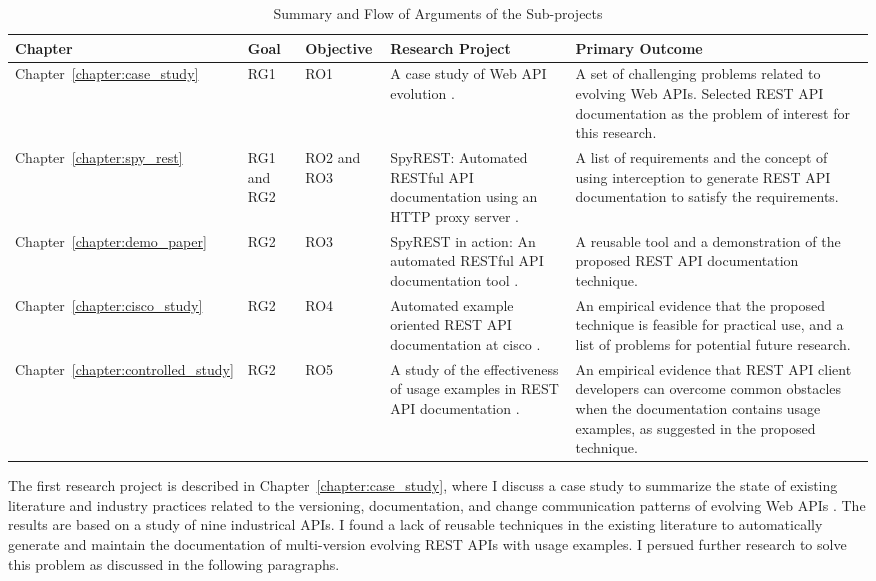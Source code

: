 \begin{table}
  \caption{Summary and Flow of Arguments of the Sub-projects}
  \begin{tabular}{|p{1.5cm}|p{1.5cm}|p{1.5cm}|p{4.5cm}|p{6cm}|}
  \hline
  Chapter & Goal & Objective & Research Project & Primary Outcome \\
  \hline
  Chapter~\ref{chapter:case_study}  & RG1 & RO1 & A case study of Web API evolution \cite{sohan2015case}. & A set of challenging problems related to evolving Web APIs. Selected REST API documentation as the problem of interest for this research. \\
  \hline
  Chapter~\ref{chapter:spy_rest} & RG1 and RG2 & RO2 and RO3 & SpyREST: Automated RESTful API documentation using an HTTP proxy server \cite{sohan2015spyrest}. & A list of requirements and the concept of using interception to generate REST API documentation to satisfy the requirements. \\
  \hline
  Chapter~\ref{chapter:demo_paper} & RG2 & RO3 & SpyREST in action: An automated RESTful API documentation tool \cite{sohan2015spyrest_tool}. & A reusable tool and a demonstration of the proposed REST API documentation technique. \\
  \hline
  Chapter~\ref{chapter:cisco_study} & RG2 & RO4 & Automated example oriented REST API documentation at cisco \cite{sohan_cisco}. & An empirical evidence that the proposed technique is feasible for practical use, and a list of problems for potential future research.\\
  \hline
  Chapter~\ref{chapter:controlled_study} & RG2 & RO5 & A study of the effectiveness of usage examples in REST API documentation \cite{sohan_vlhcc}. & An empirical evidence that REST API client developers can overcome common obstacles when the documentation contains usage examples, as suggested in the proposed technique.\\
  \hline
\end{tabular}
\label{table:chapter_summary}
\end{table}

The first research project is described in Chapter~\ref{chapter:case_study}, where I discuss a case study to summarize the state of existing literature and industry practices related to the versioning, documentation, and change communication patterns of evolving Web APIs \cite{sohan2015case}. The results are based on a study of nine industrical APIs. I found a lack of reusable techniques in the existing literature to automatically generate and maintain the documentation of multi-version evolving REST APIs with usage examples. I persued further research to solve this problem as discussed in the following paragraphs.

